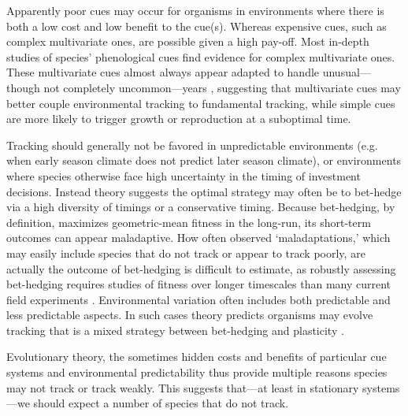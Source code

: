\documentclass[11pt,letterpaper]{article}
\newcommand{\R}[1]{\label{#1}\linelabel{#1}}
\begin{document}
Apparently poor cues may occur for organisms in environments where there is both a low cost and low benefit to the cue(s). Whereas expensive cues, such as complex multivariate ones, are possible given a high pay-off. Most in-depth studies of species' phenological cues find evidence for complex multivariate ones. These multivariate cues almost always appear adapted to handle unusual---though not completely uncommon---years \citep{chuinearees}, suggesting that multivariate cues may better couple environmental tracking to fundamental tracking, while simple cues are more likely to trigger growth or reproduction at a suboptimal time.\R{plasE}

\R{bhS}Tracking should generally not be favored in unpredictable environments (e.g. when early season climate does not predict later season climate), or environments where species otherwise face high uncertainty in the timing of investment decisions. Instead theory suggests the optimal strategy may often be to bet-hedge \citep{Venable:2007os,donald2013,decasas2015}\R{r1ass4} via a high diversity of timings or a conservative timing. Because bet-hedging, by definition, maximizes geometric-mean fitness in the long-run, its short-term outcomes can appear maladaptive. How often observed `maladaptations,' which may easily include species that do not track or appear to track poorly, are actually the outcome of bet-hedging is difficult to estimate, as robustly assessing bet-hedging requires studies of fitness over longer timescales than many current field experiments \citep{simons2011}.\R{simonsref1} Environmental variation often includes both predictable and less predictable aspects. In such cases theory predicts organisms may evolve tracking that is a mixed strategy between bet-hedging and plasticity \citep{wong2005}. 

Evolutionary theory, the sometimes hidden costs and benefits of particular cue systems and environmental predictability thus provide multiple reasons species may not track or track weakly. This suggests that---at least in stationary systems---we should expect a number of species that do not track.\R{bhE} \\
\end{document}
